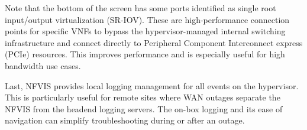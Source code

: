 Note that the bottom of the screen has some ports identified as single root
input/output virtualization (SR-IOV). These are high-performance connection
points for specific VNFs to bypass the hypervisor-managed internal switching
infrastructure and connect directly to Peripheral Component Interconnect
express (PCIe) resources. This improves performance and is especially useful
for high bandwidth use cases.


Last, NFVIS provides local logging management for all events on the
hypervisor. This is particularly useful for remote sites where WAN outages
separate the NFVIS from the headend logging servers. The on-box logging and
its ease of navigation can simplify troubleshooting during or after an outage.

